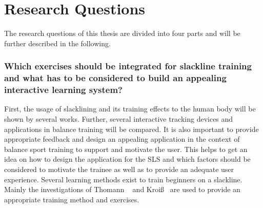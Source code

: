 \section{Research Questions}\label{1_2_researchGoals}
\begin{comment}
The research questions of this thesis are divided into four parts. 
First, the exploration of slackline training and the design of interactive tracking technologies.
Second, the conceptual design of the actual interactive slackline learning system, further called \textit{SLS}.
Third, implementation details of the system from the view point of an developer.
Lastly the investigation of the SLS with slackline beginners in a user study to investigate if a positive learning effect can be achieved and if it can compete against a common learning method.
These parts are further described in the following.
\end{comment}
The research questions of this thesis are divided into four parts and will be further described in the following.

\subsubsection{Which exercises should be integrated for slackline training and what has to be considered to build an appealing interactive learning system?}
First, the usage of slacklining and its training effects to the human body will be shown by several works.
Further, several interactive tracking devices and applications in balance training will be compared.
It is also important to provide appropriate feedback and design an appealing application in the context of balance sport training to support and motivate the user.
This helps to get an idea on how to design the application for the SLS and which factors should be considered to motivate the trainee as well as to provide an adequate user experience.
Several learning methods exist to train beginners on a slackline.
Mainly the investigations of Thomann ~\cite{Thomann2013-aa} and Kroiß~\cite{Kroiss2007-ab} are used to provide an appropriate training method and exercises. 


